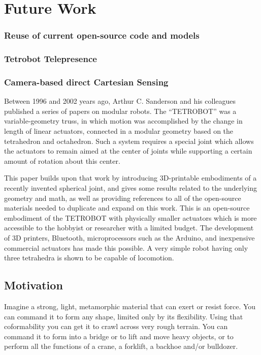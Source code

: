 \documentclass[11pt]{article}
\begin{document}
\section{Future Work}
\subsubsection{Reuse of current open-source code and models}
\subsubsection{Tetrobot Telepresence}
\subsubsection{Camera-based direct Cartesian Sensing}



Between 1996 and 2002 years ago, Arthur C. Sanderson and his colleagues published a series of
papers\cite{sanderson1996modular,lee2002dynamic,lee1999dynamics} on modular robots.
The ``TETROBOT'' was a variable-geometry truss, in which motion was accomplished by the change
in length of linear actuators, connected in a modular geometry based on the tetrahedron and octahedron.  Such a system
requires a special joint which allows the actuators to remain aimed at the center of joints while supporting
a certain amount of rotation about this center.


This paper builds upon that work by
introducing 3D-printable embodiments of
a recently invented spherical joint\cite{song2003spherical},
and gives some results related to the underlying geometry and math, as well as providing
references to all of the open-source materials needed to duplicate and expand on this work. This is an
open-source embodiment of the TETROBOT with physically smaller actuators which is more accessible to the
hobbyist or researcher with a limited budget.  The development of 3D printers, Bluetooth, microprocessors
such as the Arduino, and inexpensive commercial actuators has made this possible.
A very simple robot having only three tetrahedra is shown to be capable of locomotion.

\subsection{Motivation}

Imagine a strong, light, metamorphic material that can exert or resist force.
You can command it to form any shape, limited only by its flexibility.
Using that coformability you can get it to crawl across very rough terrain.
You can command it to form into a bridge or to lift and move heavy objects,
or to perform all the functions of a crane, a forklift, a backhoe and/or bulldozer.
\end{document}

